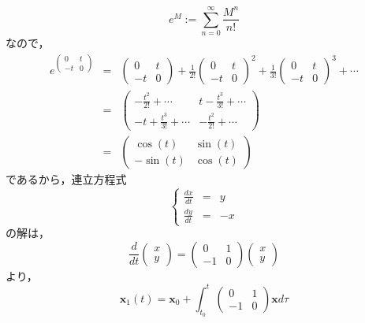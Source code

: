 \documentclass[uplatex,dvipdfmx]{jsreport}
\begin{document}
$$e^M := \sum^\infty_{n=0} \frac{M^n}{n!}$$なので，
\begin{eqnarray}
    e^{\left(\begin{array}{cc}0&t \\ -t&0\end{array}\right)} &=& \left(\begin{array}{cc}0&t \\ -t&0\end{array}\right) + \frac{1}{2!}\left(\begin{array}{cc}0&t \\ -t&0\end{array}\right)^2 + \frac{1}{3!}\left(\begin{array}{cc}0&t \\ -t&0\end{array}\right)^3 + \cdots \\
    &=& \left(\begin{array}{cc} -\frac{t^2}{2!}+\cdots & t - \frac{t^3}{3!}+\cdots \\ -t+\frac{t^3}{3!}+\cdots&-\frac{t^2}{2!}+\cdots\end{array}\right) \\
    &=& \left(\begin{array}{cc}\cos(t)&\sin(t) \\ -\sin(t) &\cos(t)\end{array}\right)
\end{eqnarray}
であるから，連立方程式
$$\left\{ \begin{array}{ccc} \frac{dx}{dt}&=&y \\ \frac{dy}{dt}&=&-x \end{array} \right.$$の解は，
\begin{equation}\frac{d}{dt}\left(\begin{array}{c} x\\ y \end{array}\right) = \left(\begin{array}{cc} 0 & 1\\-1 &0 \end{array}\right)\left( \begin{array}{c}x\\ y\end{array} \right)\end{equation}
より，
\begin{equation}\mathbf{x}_1(t)=\mathbf{x}_0+\int^t_{t_0}\left(\begin{array}{cc} 0 & 1\\-1 &0 \end{array}\right)\mathbf{x}d\tau\end{equation}
\end{document}
